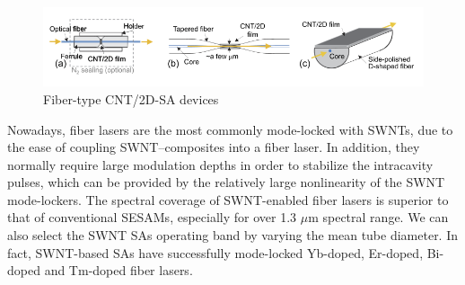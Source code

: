\documentclass{phyasgn}\usepackage{nag}
\begin{document}
\begin{figure}[!h]
	\centering
	\includegraphics[width=1.0\linewidth]{pic/11.png}
	\caption[Band structures]{Fiber-type CNT/2D-SA devices\cite{song2007polarization}}
	\label{11}
	\end{figure}
\par Nowadays, fiber lasers are the most commonly mode-locked with SWNTs, due to the ease of coupling SWNT–composites into a fiber laser. In addition, they normally require large modulation depths in order to stabilize the intracavity pulses, which can be provided by the relatively large nonlinearity of the SWNT mode-lockers. The spectral coverage of SWNT-enabled fiber lasers is superior to that of conventional SESAMs, especially for over 1.3 $\mu$m spectral range. We can also select the SWNT SAs operating band by varying the mean tube diameter. In fact, SWNT-based SAs have successfully mode-locked Yb-doped\cite{goh2005femtosecond}, Er-doped\cite{wang2008f}, Bi-doped\cite{kelleher2010bismuth} and Tm-doped\cite{solodyankin2008mode} fiber lasers.
\end{document}

